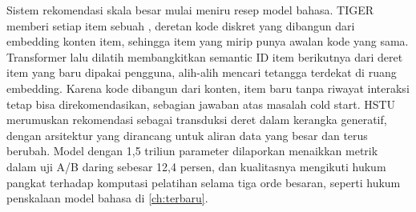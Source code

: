 Sistem rekomendasi skala besar mulai meniru resep model bahasa. TIGER \citep{rajput2023} memberi setiap item sebuah
, deretan kode diskret yang dibangun dari embedding konten item, sehingga item yang mirip punya awalan
kode yang sama. Transformer lalu dilatih membangkitkan semantic ID item berikutnya dari deret item yang baru dipakai
pengguna, alih-alih mencari tetangga terdekat di ruang embedding. Karena kode dibangun dari konten, item baru tanpa
riwayat interaksi tetap bisa direkomendasikan, sebagian jawaban atas masalah cold start. HSTU \citep{zhai2024} merumuskan
rekomendasi sebagai transduksi deret dalam kerangka generatif, dengan arsitektur yang dirancang untuk aliran data yang
besar dan terus berubah. Model dengan 1,5 triliun parameter dilaporkan menaikkan metrik dalam uji A/B daring sebesar
12,4 persen, dan kualitasnya mengikuti hukum pangkat terhadap komputasi pelatihan selama tiga orde besaran, seperti hukum
penskalaan model bahasa di \cref{ch:terbaru}.

